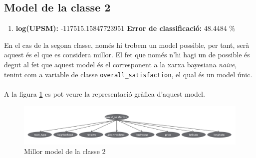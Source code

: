	\subsection{Model de la classe 2}
	\begin{enumerate}
		\item \textbf{log(UPSM):} -117515.15847723951 \textbf{Error de classificació:} 48.4484 \%
	\end{enumerate}
	\vspace{0.5cm}
	En el cas de la segona classe, només hi trobem un model possible, per tant, serà aquest és el que es considera millor. El fet que només n'hi hagi un de possible és degut al fet que aquest model és el corresponent a la xarxa bayesiana \textit{naive}, tenint com a variable de classe \verb|overall_satisfaction|, el qual és un model únic.\\
	\\
	A la figura \ref{fig:model2} es pot veure la representació gràfica d'aquest model.
	\vspace{0.3cm}
	\begin{figure}[H]
		\centering
		\includegraphics[width=15cm]{imgs/model2.png}
		\caption{Millor model de la classe 2}
		\label{fig:model2}
	\end{figure}
	\vspace{0.5cm}
